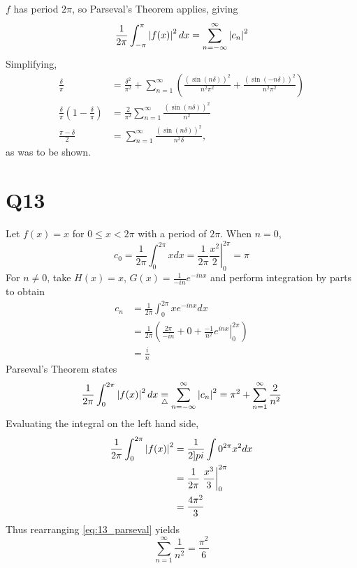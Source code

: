\documentclass[12pt]{article}
\begin{document}
\subsection{}
$f$ has period $2\pi$, so Parseval's Theorem applies, giving 
$$\frac{1}{2\pi} \int_{-\pi}^{\pi} \left|f(x)\right|^2 dx = \sum_{n = -\infty}^{\infty} \left|c_n\right|^2$$
Simplifying,
\begin{align*}
  \frac{\delta}{\pi} & = \frac{\delta^2}{\pi^2} + \sum_{n = 1}^{\infty} \left( \frac{(\sin(n\delta))^2}{n^2\pi^2} + \frac{(\sin(-n\delta))^2}{n^2 \pi^2} \right) \\ 
  \frac{\delta}{\pi}(1 - \frac{\delta}{\pi}) & = \frac{2}{\pi^2} \sum_{n = 1}^{\infty} \frac{(\sin(n\delta))^2}{n^2} \\ 
  \frac{\pi - \delta}{2} & = \sum_{n = 1}^{\infty} \frac{(\sin(n\delta))^2}{n^2\delta},
\end{align*}
as was to be shown. 

\section*{Q13}
Let $f(x) = x$ for $0 \leq x < 2\pi$ with a period of $2\pi$. 
When $n = 0$, 
$$c_0 = \frac{1}{2\pi} \int_{0}^{2\pi} x dx = \frac{1}{2\pi} \left. \frac{x^2}{2}\right|_{0}^{2\pi}  = \pi$$
For $n \neq 0$, take $H(x) = x$, $G(x) = \frac{1}{-in} e^{-inx}$ and perform integration by parts to obtain 
\begin{align*}
  c_n & = \frac{1}{2\pi} \int_{0}^{2\pi} x e^{-inx} dx \\ 
      & = \frac{1}{2\pi} (\frac{2\pi}{-in} + 0 + \frac{-1}{n^2} \left.e^{inx}\right|_{0}^{2\pi}) \\ 
      & = \frac{i}{n}
\end{align*}
Parseval's Theorem states 
\begin{equation} \label{eq:13_parseval}
  \frac{1}{2\pi} \int_{0}^{2\pi} \left|f(x)\right|^2 dx \underset{\triangle}{=} \sum_{n = -\infty}^{\infty} \left|c_n\right|^2 = \pi^2 + \sum_{n = 1}^{\infty} \frac{2}{n^2}
\end{equation}
Evaluating the integral on the left hand side, 
\begin{align*}
  \frac{1}{2\pi} \int_{0}^{2\pi} \left|f(x)\right|^2  
  & = \frac{1}{2]pi} \int{0}^{2\pi} x^2 dx \\ 
  & = \frac{1}{2\pi} \left.\frac{x^3}{3}\right|_{0}^{2\pi} \\ 
  & = \frac{4\pi^2}{3}
\end{align*}
Thus rearranging \eqref{eq:13_parseval} yields 
$$\sum_{n = 1}^{\infty} \frac{1}{n^2} = \frac{\pi^2}{6}$$
\end{document}
